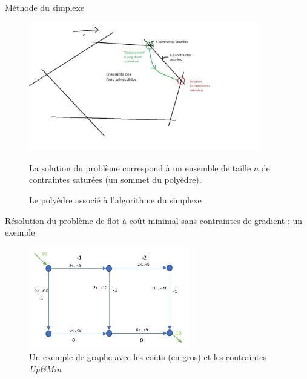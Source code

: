 \documentclass{beamer}
\begin{document}
\begin{frame}{Méthode du simplexe}

\begin{figure}[H]
    \begin{minipage}[c]{.66\linewidth}
        \includegraphics[width=10cm]{simplexe.jpg}
        \caption{Le polyèdre associé à l'algorithme du simplexe}
        \label{fig:simplexe}
    \end{minipage} \hfill
    \begin{minipage}[c]{.26\linewidth}
        La solution du problème correspond à un ensemble de taille $n$ de contraintes saturées (un sommet du polyèdre).
    \end{minipage}
\end{figure}
\insertframenumber\end{frame}


\begin{frame}{Résolution du problème de flot à coût minimal sans contraintes de gradient : un exemple}
    \begin{figure}[h]
    \centering
        \includegraphics[width=7cm]{exemplesanscontchiffre.JPG}
        \caption{Un exemple de graphe avec les coûts (en gros) et les contraintes \textit{Up\&Min}}
        \label{fig:exsansgrad}
    \end{figure}
\insertframenumber\end{frame}
\end{document}

